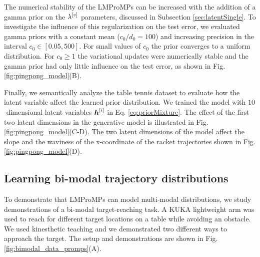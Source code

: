The numerical stability of the LMProMPs can be increased with the addition of a gamma
prior on the $ {\lambda^{[v]}} $ parameters, discussed in Subsection \ref{sec:latentSingle}. 
To investigate the influence of this regularization on the test error, we evaluated
gamma priors with a constant mean ($c_0/d_0=100$) and increasing precision in
the interval $c_0\in [0.05, 500]$. For small values of $c_0$ the prior converges
to a uniform distribution. For $c_0\ge1$ the variational updates were
numerically stable and the gamma prior had only little influence on the test
error, as shown in Fig. \ref{fig:pingpong_model}(B).
  

Finally, we semantically analyze the table tennis dataset to evaluate how the
latent variable affect the learned prior distribution.  We trained the
model with $10$-dimensional latent variables $\boldsymbol{h}^{[i]} $
in Eq. \eqref{eq:priorMixture}. The effect of the first two latent dimensions
in the generative model is illustrated in Fig. \ref{fig:pingpong_model}(C-D).
The two latent dimensions of the model affect the slope and the waviness of the
x-coordinate of the racket trajectories shown in Fig. \ref{fig:pingpong_model}(D).


\subsection{Learning bi-modal trajectory distributions}

To demonstrate that LMProMPs can model multi-modal distributions,  
we study demonstrations of a bi-modal target-reaching task. 
A KUKA lightweight arm was used to reach for 
different target locations on a table while avoiding an obstacle. 
We used kinesthetic teaching and we demonstrated two different ways to approach the target. The
setup and demonstrations are shown in Fig. \ref{fig:bimodal_data_promps}(A). 

